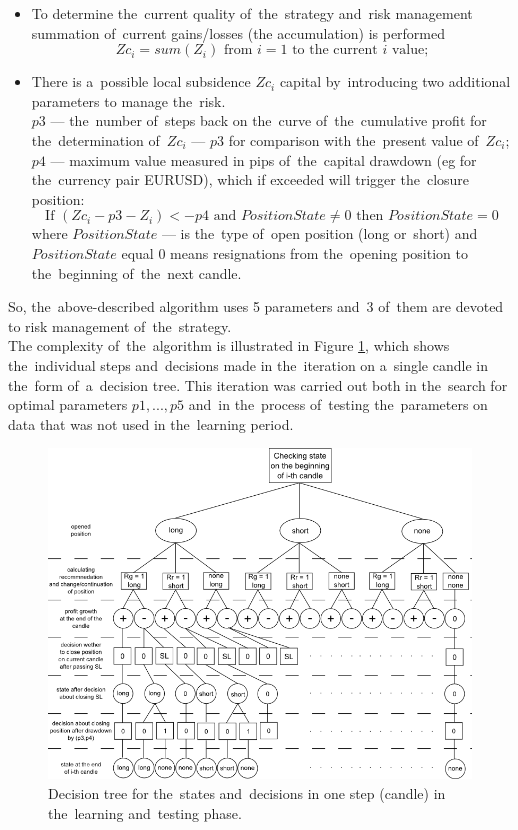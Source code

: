 \documentclass[runningheads,a4paper]{llncs}
\begin{document}
\begin{itemize}
\item To determine the~current quality of~the~strategy and~risk management summation of~current gains/losses (the accumulation) is performed
\begin{equation}
Zc_i = sum ( Z_i ) \text{ from } i = 1 \text{ to the~current } i \text{ value;}
\end{equation}
\item There is a~possible local subsidence $Zc_i$ capital by~introducing two additional parameters to manage the~risk.\\
$p3$ --- the~number of~steps back on the~curve of~the~cumulative profit for the~determination of~$Zc_i$ --- $p3$ for comparison with the~present value of~$Zc_i$;
$p4$ --- maximum value measured in pips of~the~capital drawdown (eg for the~currency pair EURUSD), which if exceeded will trigger the~closure position:\\
\begin{equation}
\text{If } ( Zc_i - p3 - Z_i ) <- p4 \text{ and~} PositionState \neq 0 \text{ then } PositionState = 0
\end{equation} 
where $PositionState$ --- is the~type of~open position (long or~short) and~$PositionState$ equal 0 means resignations from the~opening position to the~beginning of~the~next candle.
\end{itemize}
So, the~above-described algorithm uses 5 parameters and~3 of~them are devoted to risk management of~the~strategy.\\
The complexity of~the~algorithm is illustrated in Figure \ref{fig:fig7}, which shows the~individual steps and~decisions made in the~iteration on a~single candle in the~form of~a~decision tree. This iteration was carried out both in the~search for optimal parameters $p1, ..., p5$ and~in the~process of~testing the~parameters on data that was not used in the~learning period.
\begin{figure}[h!]
\centering
\includegraphics[width = \textwidth]{figures/rys7.png}
\caption{Decision tree for the~states and~decisions in one step (candle) in the~learning and~testing phase.}
\label{fig:fig7}
\end{figure}
\FloatBarrier
\end{document}
